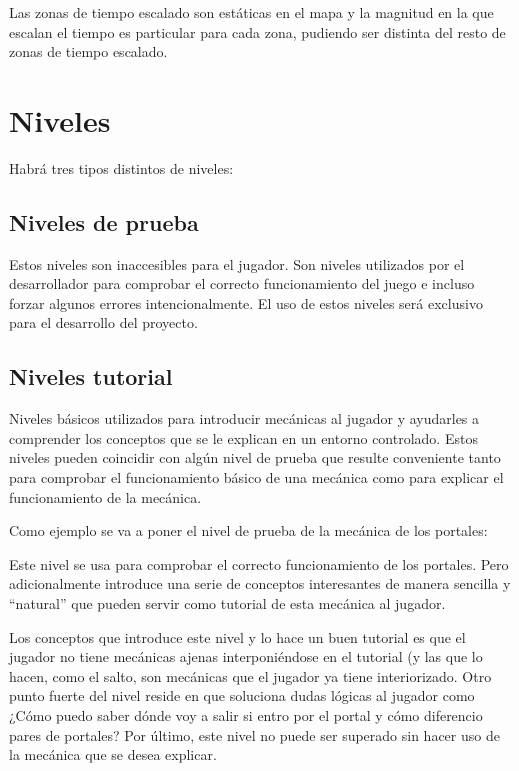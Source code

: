 Las zonas de tiempo escalado son estáticas en el mapa y la magnitud en la que escalan el tiempo es particular para cada zona, pudiendo ser distinta del resto de zonas de tiempo escalado.


\section{Niveles}
Habrá tres tipos distintos de niveles:

\subsection{Niveles de prueba}
Estos niveles son inaccesibles para el jugador. Son niveles utilizados por el desarrollador para comprobar el correcto funcionamiento del juego e incluso forzar algunos errores intencionalmente. El uso de estos niveles será exclusivo para el desarrollo del proyecto.

\subsection{Niveles tutorial}
Niveles básicos utilizados para introducir mecánicas al jugador y ayudarles a comprender los conceptos que se le explican en un entorno controlado. Estos niveles pueden coincidir con algún nivel de prueba que resulte conveniente tanto para comprobar el funcionamiento básico de una mecánica como para explicar el funcionamiento de la mecánica.

Como ejemplo se va a poner el nivel de prueba de la mecánica de los portales:


Este nivel se usa para comprobar el correcto funcionamiento de los portales. Pero adicionalmente introduce una serie de conceptos interesantes de manera sencilla y “natural” que pueden servir como tutorial de esta mecánica al jugador. 

Los conceptos que introduce este nivel y lo hace un buen tutorial es que el jugador no tiene mecánicas ajenas interponiéndose en el tutorial (y las que lo hacen, como el salto, son mecánicas que el jugador ya tiene interiorizado. Otro punto fuerte del nivel reside en que soluciona dudas lógicas al jugador como ¿Cómo puedo saber dónde voy a salir si entro por el portal y cómo diferencio pares de portales? Por último, este nivel no puede ser superado sin hacer uso de la mecánica que se desea explicar.

